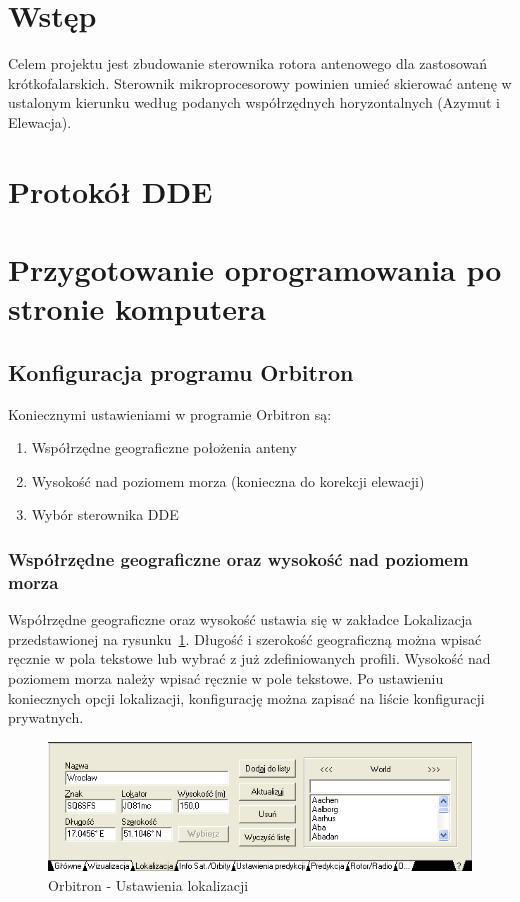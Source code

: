 \documentclass[12pt,a4paper]{article}
\begin{document}
	
	

	\tableofcontents
	\clearpage

	\section{Wstęp}
	Celem projektu jest zbudowanie sterownika rotora antenowego dla zastosowań krótkofalarskich. Sterownik mikroprocesorowy powinien umieć skierować antenę w ustalonym kierunku według podanych współrzędnych horyzontalnych (Azymut i Elewacja).

	\section{Protokół DDE}

	\section{Przygotowanie oprogramowania po stronie komputera}
		
		\subsection{Konfiguracja programu Orbitron}
		Koniecznymi ustawieniami w programie Orbitron są:
		\begin{enumerate}
			\item Współrzędne geograficzne położenia anteny
			\item Wysokość nad poziomem morza (konieczna do korekcji elewacji)
			\item Wybór sterownika DDE
		\end{enumerate}

			\subsubsection{Współrzędne geograficzne oraz wysokość nad poziomem morza}
			Współrzędne geograficzne oraz wysokość ustawia się w zakładce Lokalizacja przedstawionej na rysunku~\ref{fig:location_settings}. Długość i szerokość geograficzną można wpisać ręcznie w pola tekstowe lub wybrać z już zdefiniowanych profili. Wysokość nad poziomem morza należy wpisać ręcznie w pole tekstowe. Po ustawieniu koniecznych opcji lokalizacji, konfigurację można zapisać na liście konfiguracji prywatnych.

			\begin{figure}[!htb]
				\begin{center}
					\includegraphics[scale=0.7]{screen1}
				\end{center}
				\caption{Orbitron - Ustawienia lokalizacji}
				\label{fig:location_settings}
			\end{figure}
\end{document}
